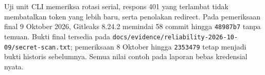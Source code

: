 Uji unit CLI memeriksa rotasi serial, respons 401 yang terlambat tidak membatalkan token yang lebih baru, serta penolakan redirect. Pada pemeriksaan final 9 Oktober 2026, Gitleaks 8.24.2 memindai 58 commit hingga \texttt{48987b7} tanpa temuan. Bukti final tersedia pada \nolinkurl{docs/evidence/reliability-2026-10-09/secret-scan.txt}; pemeriksaan 8 Oktober hingga \texttt{2353479} tetap menjadi bukti historis sebelumnya. Semua nilai contoh pada laporan bebas kredensial nyata.
